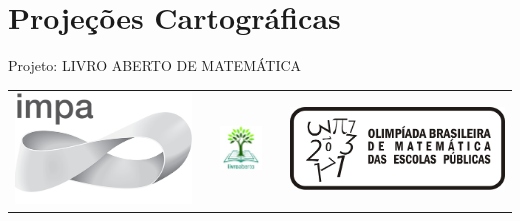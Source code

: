 \renewcommand\chapterillustration{abertura-cartografia.jpg}
\renewcommand\chapterwhat{Projeções cartográficas. Classificação das projeções cartográficas quanto à superfície de projeção (planas, cônicas e cilíndricas) e quanto as propriedades (equivalentes, equidistantes, conformes e afiláticas).}
\renewcommand\chapterbecause{Projeções cartográficas são projeções da superfície terrestre no plano que possibilitam a visualização de uma área muito grande em uma única folha. Tornando possível, por exemplo, o planejamento de rotas ou organizações territoriais de um país inteiro em cima de uma mesa. Existem diferentes tipos de projeções e cada uma possui algum tipo de distorção (em relação a área, ângulo ou distância). As projeções cartográficas mais conhecidas são as cônicas, planas e cilíndricas, portanto serão a essas que daremos ênfase no capítulo.}
\chapter{Projeções Cartográficas}



\mbox{}\thispagestyle{empty}\clearpage

\thispagestyle{empty}

\begin{center}
Projeto: LIVRO ABERTO DE MATEMÁTICA

\noindent \begin{tabular}{lcccr}
\includegraphics[scale=.15]{impa}& \quad\quad& \includegraphics[width=3cm]{logo} & \quad\quad& \includegraphics[scale=.24]{obmep} 
\end{tabular}
\end{center}

